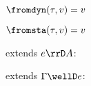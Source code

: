 {\flushleft

$\fromdyn(\tau, v) = v$

\smallskip

$\fromsta(\tau, v) = v$

\medskip
{} extends $e \rrD A$:
\begin{mathpar}


\end{mathpar}

\medskip
{} extends $\Gamma \wellD e$:
\begin{mathpar}


\end{mathpar}

}
